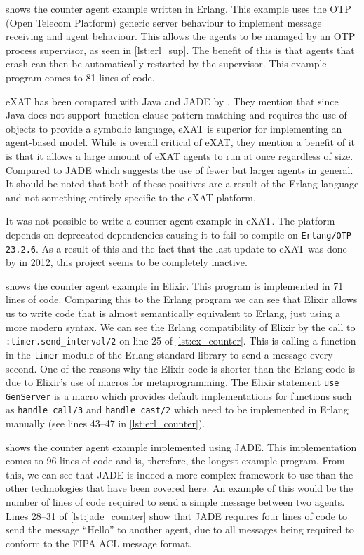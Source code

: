  shows the counter agent example written in Erlang.
This example uses the OTP (Open Telecom Platform) generic server behaviour to implement message receiving and agent behaviour.
This allows the agents to be managed by an OTP process supervisor, as seen in \cref{lst:erl_sup}.
The benefit of this is that agents that crash can then be automatically restarted by the supervisor.
This example program comes to 81 lines of code.

eXAT has been compared with Java and JADE by .
They mention that since Java does not support function clause pattern matching and requires the use of objects to provide a symbolic language, eXAT is superior for implementing an agent-based model.
While  is overall critical of eXAT, they mention a benefit of it is that it allows a large amount of eXAT agents to run at once regardless of size.
Compared to JADE which suggests the use of fewer but larger agents in general.
It should be noted that both of these positives are a result of the Erlang language and not something entirely specific to the eXAT platform.

It was not possible to write a counter agent example in eXAT\@.
The platform depends on deprecated dependencies causing it to fail to compile on \verb|Erlang/OTP 23.2.6|.
As a result of this and the fact that the last update to eXAT was done by  in 2012, this project seems to be completely inactive.

 shows the counter agent example in Elixir.
This program is implemented in 71 lines of code.
Comparing this to the Erlang program we can see that Elixir allows us to write code that is almost semantically equivalent to Erlang, just using a more modern syntax.
We can see the Erlang compatibility of Elixir by the call to \verb|:timer.send_interval/2| on line 25 of \cref{lst:ex_counter}.
This is calling a function in the \verb|timer| module of the Erlang standard library to send a message every second.
One of the reasons why the Elixir code is shorter than the Erlang code is due to Elixir's use of macros for metaprogramming.
The Elixir statement \verb|use GenServer| is a macro which provides default implementations for functions such as \verb|handle_call/3| and \verb|handle_cast/2| which need to be implemented in Erlang manually (see lines 43--47 in \cref{lst:erl_counter}).

 shows the counter agent example implemented using JADE\@.
This implementation comes to 96 lines of code and is, therefore, the longest example program.
From this, we can see that JADE is indeed a more complex framework to use than the other technologies that have been covered here.
An example of this would be the number of lines of code required to send a simple message between two agents.
Lines 28--31 of \cref{lst:jade_counter} show that JADE requires four lines of code to send the message ``Hello'' to another agent, due to all messages being required to conform to the FIPA ACL message format.

